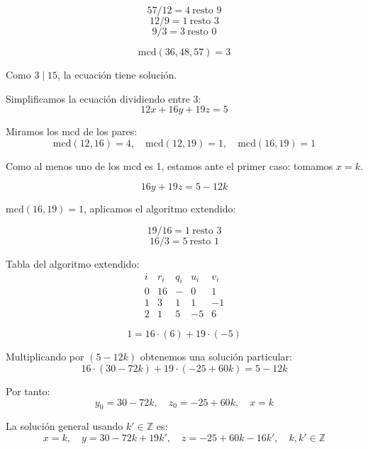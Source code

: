 \documentclass[a4paper,12pt]{article}
\begin{document}
\begin{ejercicio}[title=Ejercicio 9]
    
\[
57 / 12 = 4 \ \text{resto } 9
\]
\[
12 / 9 = 1 \ \text{resto } \boxed{3}
\]
\[
9 / 3 = 3 \ \text{resto } 0
\]

\[
\text{mcd}(36,48,57) = \boxed{3}
\]

Como $3 \mid 15$, la ecuación tiene solución.

\vspace{0.5em}

Simplificamos la ecuación dividiendo entre $3$:
\[
12x + 16y + 19z = 5
\]

\vspace{0.5em}

Miramos los mcd de los pares:
\[
\text{mcd}(12,16) = 4, \quad \text{mcd}(12,19) = 1, \quad \text{mcd}(16,19) = 1
\]

Como al menos uno de los mcd es 1, estamos ante el primer caso: tomamos $x = k$.

\[
16y + 19z = 5 - 12k
\]

$\text{mcd}(16,19) = \boxed{1}$, aplicamos el algoritmo extendido:

\[
19 / 16 = 1 \ \text{resto } 3
\]
\[
16 / 3 = 5 \ \text{resto } \boxed{1}
\]

Tabla del algoritmo extendido:
\[
\begin{array}{c|c|c|c|c}
i & r_i & q_i & u_i & v_i\\
\hline
0 & 16 & - & 0 & 1\\
1 & 3 & 1 & 1 & -1\\
2 & \boxed{1} & 5 & -5 & 6
\end{array}
\]

\[
\boxed{1} = 16 \cdot (6) + 19 \cdot (-5)
\]

Multiplicando por $(5 - 12k)$ obtenemos una solución particular:
\[
16 \cdot (30 - 72k) + 19 \cdot (-25 + 60k) = 5 - 12k
\]

Por tanto:
\[
y_0 = 30 - 72k, \quad z_0 = -25 + 60k, \quad x = k
\]

La solución general usando $k'\in \mathbb{Z}$ es:
\[
\boxed{
x = k, \quad y = 30 - 72k + 19k', \quad z = -25 + 60k - 16k', \quad k,k' \in \mathbb{Z}
}
\]

\end{ejercicio}
\end{document}
